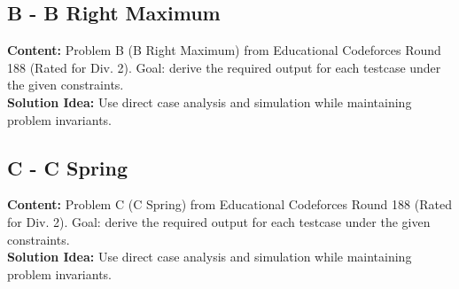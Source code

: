 \documentclass[11pt]{article}
\begin{document}
\subsection{B - B Right Maximum}
\textbf{Content:} Problem B (B Right Maximum) from Educational Codeforces Round 188 (Rated for Div. 2). Goal: derive the required output for each testcase under the given constraints.\\
\textbf{Solution Idea:} Use direct case analysis and simulation while maintaining problem invariants.

\subsection{C - C Spring}
\textbf{Content:} Problem C (C Spring) from Educational Codeforces Round 188 (Rated for Div. 2). Goal: derive the required output for each testcase under the given constraints.\\
\textbf{Solution Idea:} Use direct case analysis and simulation while maintaining problem invariants.
\end{document}
